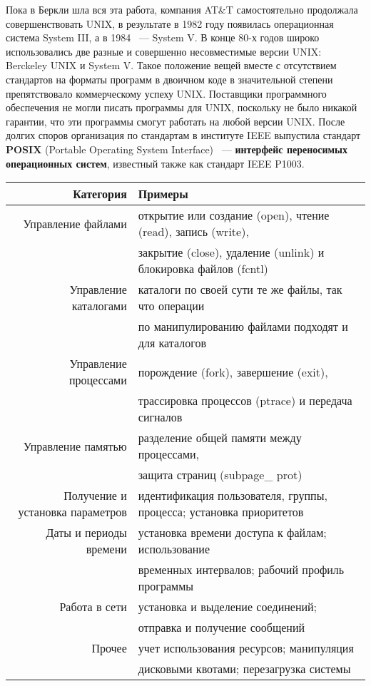 \documentclass[11pt]{article}
\begin{document}
	Пока в Беркли шла вся эта работа, компания AT\&T самостоятельно продолжала совершенствовать UNIX, в результате в 1982 году появилась операционная система System III, а в 1984 ~--- System V. В конце 80-х годов широко использовались две разные и совершенно несовместимые версии UNIX: Berckeley UNIX и System V. Такое положение вещей вместе с отсутствием стандартов на форматы программ в двоичном коде в значительной степени препятствовало коммерческому успеху UNIX. Поставщики программного обеспечения не могли писать программы для UNIX, поскольку не было никакой гарантии, что эти программы смогут работать на любой версии UNIX. После долгих споров организация по стандартам в институте IEEE выпустила стандарт \textbf{POSIX} (Portable Operating System Interface) ~--- \textbf{интерфейс переносимых операционных систем}, известный также как стандарт IEEE P1003.
	\begin{table}[h!t]
		\begin{tabular}{r | l}
			Категория             & Примеры\\\hline
			Управление файлами    & открытие или создание (open), чтение (read), запись (write),\\
			                      & закрытие (close), удаление (unlink) и блокировка файлов (fcntl)\\\hline
			Управление каталогами & каталоги по своей сути те же файлы, так что операции\\
			                      & по манипулированию файлами подходят и для каталогов\\\hline
			Управление процессами & порождение (fork), завершение (exit),\\
			                      & трассировка процессов (ptrace) и передача сигналов\\\hline
			Управление памятью    & разделение общей памяти между процессами,\\
			                      & защита страниц (subpage\_ prot)\\\hline
			Получение и установка параметров & идентификация пользователя, группы, процесса; установка приоритетов\\\hline
			Даты и периоды времени & установка времени доступа к файлам; использование\\
			                       & временных интервалов; рабочий профиль программы\\\hline
			Работа в сети & установка и выделение соединений;\\
			              & отправка и получение сообщений\\\hline
			Прочее & учет использования ресурсов; манипуляция\\
			       & дисковыми квотами; перезагрузка системы\\\hline
		\end{tabular}
	\end{table}
\end{document}
